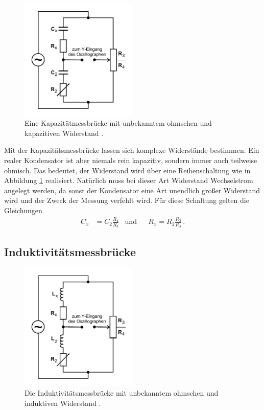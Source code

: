 \begin{figure}
    \centering
    \includegraphics[width=0.5\textwidth]{pictures/schaltung3.pdf}
    \caption{Eine Kapazitätmessbrücke mit unbekanntem ohmschen und kapazitiven Widerstand \cite[5]{v302}.}
    \label{fig:Schaltung3}
\end{figure}

Mit der Kapazitätsmessbrücke lassen sich komplexe Widerstände bestimmen. 
Ein realer Kondensator ist aber niemals rein kapazitiv, sondern immer auch teilweise ohmisch.
Das bedeutet, der Widerstand wird über eine Reihenschaltung wie in Abbildung \ref{fig:Schaltung3} realisiert.
Natürlich muss bei dieser Art Widerstand Wechselstrom angelegt werden, da sonst der Kondensator eine Art 
unendlich großer Widerstand wird und der Zweck der Messung verfehlt wird.
Für diese Schaltung gelten die Gleichungen
\begin{align} \label{eq:Cx}
    C_x &= C_2 \frac {R_4}{R_3} & \text{und} & &   R_x = R_2 \frac {R_3}{R_4} \, .
\end{align}

\subsection{Induktivitätsmessbrücke}

\begin{figure}
    \centering
    \includegraphics[width=0.5\textwidth]{pictures/schaltung4.pdf}
    \caption{Die Induktivitätsmessbrücke mit unbekanntem ohmschen und induktiven Widerstand \cite[6]{v302}.}
    \label{fig:Schaltung4}
\end{figure}


